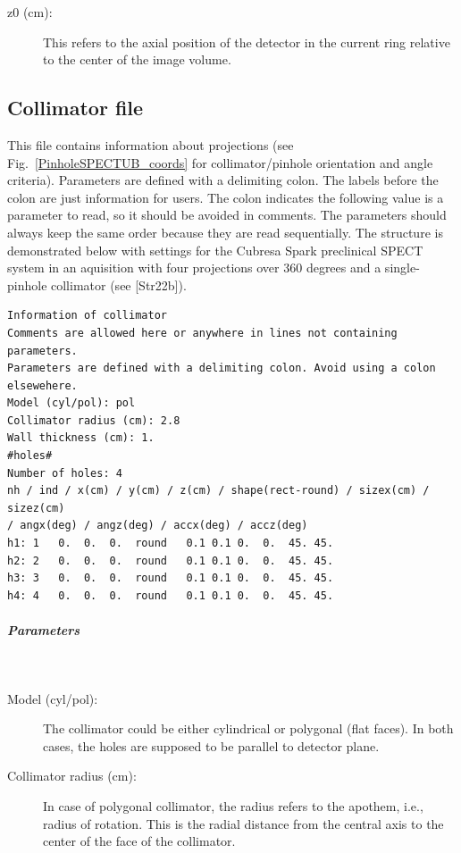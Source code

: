 \documentclass{article}
\newcommand{\subsubsubsubsection}[1]{\subparagraph{#1} \mbox{} \\}
\begin{document}
{{{{\begin{description}
\item[z0 (cm):] This refers to the axial position of the detector in the current ring relative to the center of the image volume.

\end{description}

{ {\subsection*{{Collimator file} }
This file contains information about projections (see Fig.~\ref{PinholeSPECTUB_coords} for collimator/pinhole orientation and angle criteria). Parameters are defined with a delimiting colon. The labels before the colon are just information for users. The colon indicates the following value is a parameter to read, so it should be avoided in comments. The parameters should always keep the same order because they are read sequentially. The structure is demonstrated below with settings for the Cubresa Spark preclinical SPECT system in an aquisition with four projections over 360 degrees and a single-pinhole collimator (see [Str22b]).

\begin{verbatim}
Information of collimator
Comments are allowed here or anywhere in lines not containing parameters.
Parameters are defined with a delimiting colon. Avoid using a colon elsewehere.
Model (cyl/pol): pol
Collimator radius (cm): 2.8
Wall thickness (cm): 1.
#holes#
Number of holes: 4
nh / ind / x(cm) / y(cm) / z(cm) / shape(rect-round) / sizex(cm) / sizez(cm)
/ angx(deg) / angz(deg) / accx(deg) / accz(deg)
h1:	1	0.	0.	0.	round	0.1	0.1	0.	0.	45.	45.
h2:	2	0.	0.	0.	round	0.1	0.1	0.	0.	45.	45.
h3:	3	0.	0.	0.	round	0.1	0.1	0.	0.	45.	45.
h4:	4	0.	0.	0.	round	0.1	0.1	0.	0.	45.	45.
\end{verbatim}

{ \subsubsubsubsection{Parameters} }
\begin{description}

\item[Model (cyl/pol):] The collimator could be either cylindrical or polygonal (flat faces). In both cases, the holes are supposed to be parallel to detector plane.

\item[Collimator radius (cm):] In case of polygonal collimator, the radius refers to the apothem, i.e., radius of rotation. This is the radial distance from the central axis to the center of the face of the collimator.


\end{description}}}}}}}
\end{document}
